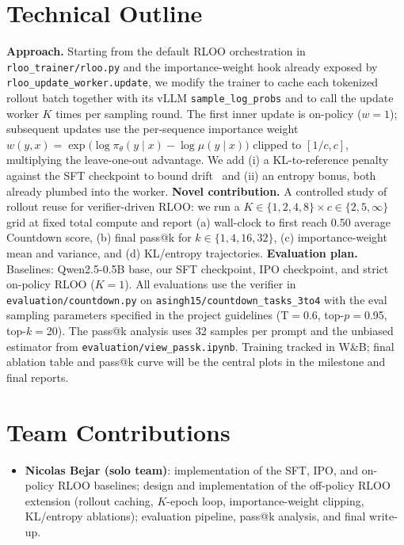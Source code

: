 \documentclass{article}
\begin{document}
\section{Technical Outline}
\textbf{Approach.} Starting from the default RLOO orchestration in \texttt{rloo\_trainer/rloo.py} and the importance-weight hook already exposed by \texttt{rloo\_update\_worker.update}, we modify the trainer to cache each tokenized rollout batch together with its vLLM \texttt{sample\_log\_probs} and to call the update worker $K$ times per sampling round. The first inner update is on-policy ($w{=}1$); subsequent updates use the per-sequence importance weight $w(y,x){=}\exp\bigl(\log\pi_\theta(y\mid x)-\log\mu(y\mid x)\bigr)$ clipped to $[1/c,c]$, multiplying the leave-one-out advantage. We add (i) a KL-to-reference penalty against the SFT checkpoint to bound drift~\cite{rlhf} and (ii) an entropy bonus, both already plumbed into the worker. \textbf{Novel contribution.} A controlled study of rollout reuse for verifier-driven RLOO: we run a $K{\in}\{1,2,4,8\}\times c{\in}\{2,5,\infty\}$ grid at fixed total compute and report (a) wall-clock to first reach 0.50 average Countdown score, (b) final pass@k for $k{\in}\{1,4,16,32\}$, (c) importance-weight mean and variance, and (d) KL/entropy trajectories. \textbf{Evaluation plan.} Baselines: Qwen2.5-0.5B base, our SFT checkpoint, IPO checkpoint, and strict on-policy RLOO ($K{=}1$). All evaluations use the verifier in \texttt{evaluation/countdown.py} on \texttt{asingh15/countdown\_tasks\_3to4} with the eval sampling parameters specified in the project guidelines (T$=$0.6, top-$p$$=$0.95, top-$k$$=$20). The pass@k analysis uses 32 samples per prompt and the unbiased estimator from \texttt{evaluation/view\_passk.ipynb}. Training tracked in W\&B; final ablation table and pass@k curve will be the central plots in the milestone and final reports.

\section{Team Contributions}
\begin{itemize}
    \item \textbf{Nicolas Bejar (solo team)}: implementation of the SFT, IPO, and on-policy RLOO baselines; design and implementation of the off-policy RLOO extension (rollout caching, $K$-epoch loop, importance-weight clipping, KL/entropy ablations); evaluation pipeline, pass@k analysis, and final write-up.
\end{itemize}



\end{document}
